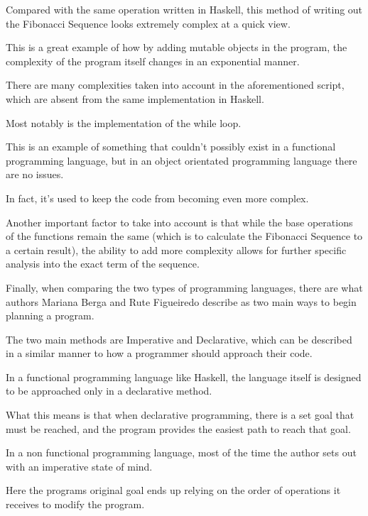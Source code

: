 \documentclass{article}
\begin{document}
\medskip\noindent
Compared with the same operation written in Haskell, this method of writing out the Fibonacci Sequence looks extremely complex at a quick view. 

\medskip\noindent
This is a great example of how by adding mutable objects in the program, the complexity of the program itself changes in an exponential manner.

\medskip\noindent
There are many complexities taken into account in the aforementioned script, which are absent from the same implementation in Haskell. 

\medskip\noindent
Most notably is the implementation of the while loop. 

\medskip\noindent
This is an example of something that couldn't possibly exist in a functional programming language, but in an object orientated programming language there are no issues. 

\medskip\noindent
In fact, it's used to keep the code from becoming even more complex.

\medskip\noindent
Another important factor to take into account is that while the base operations of the functions remain the same (which is to calculate the Fibonacci Sequence to a certain result), the ability to add more complexity allows for further specific analysis into the exact term of the sequence. 

\medskip\noindent
Finally, when comparing the two types of programming languages, there are what authors Mariana Berga and Rute Figueiredo \cite{IC} describe as two main ways to begin planning a program. 

\medskip\noindent
The two main methods are Imperative and Declarative, which can be described in a similar manner to how a programmer should approach their code.  

\medskip\noindent
In a functional programming language like Haskell, the language itself is designed to be approached only in a declarative method. 

\medskip\noindent
What this means is that when declarative programming, there is a set goal that must be reached, and the program provides the easiest path to reach that goal.  

\medskip\noindent
In a non functional programming language, most of the time the author sets out with an imperative state of mind.

\medskip\noindent
Here the programs original goal ends up relying on the order of operations it receives to modify the program.
\end{document}
